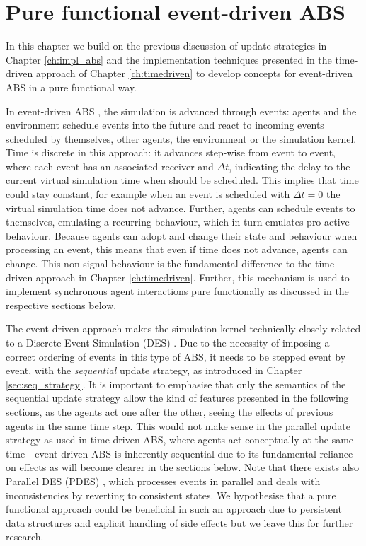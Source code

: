 \chapter{Pure functional event-driven ABS}
\label{ch:eventdriven}

In this chapter we build on the previous discussion of update strategies in Chapter \ref{ch:impl_abs} and the implementation techniques presented in the time-driven approach of Chapter \ref{ch:timedriven} to develop concepts for event-driven ABS in a pure functional way. 

\medskip

In event-driven ABS \cite{meyer_event-driven_2014}, the simulation is advanced through events: agents and the environment schedule events into the future and react to incoming events scheduled by themselves, other agents, the environment or the simulation kernel. Time is discrete in this approach: it advances step-wise from event to event, where each event has an associated receiver and $\Delta t$, indicating the delay to the current virtual simulation time when should be scheduled. This implies that time could stay constant, for example when an event is scheduled with $\Delta t = 0$ the virtual simulation time does not advance. Further, agents can schedule events to themselves, emulating a recurring behaviour, which in turn emulates pro-active behaviour. Because agents can adopt and change their state and behaviour when processing an event, this means that even if time does not advance, agents can change. This non-signal behaviour is the fundamental difference to the time-driven approach in Chapter \ref{ch:timedriven}. Further, this mechanism is used to implement synchronous agent interactions pure functionally as discussed in the respective sections below.

The event-driven approach makes the simulation kernel technically closely related to a Discrete Event Simulation (DES) \cite{zeigler_theory_2000}. Due to the necessity of imposing a correct ordering of events in this type of ABS, it needs to be stepped event by event, with the \textit{sequential} update strategy, as introduced in Chapter \ref{sec:seq_strategy}. It is important to emphasise that only the semantics of the sequential update strategy allow the kind of features  presented in the following sections, as the agents act one after the other, seeing the effects of previous agents in the same time step. This would not make sense in the parallel update strategy as used in time-driven ABS, where agents act conceptually at the same time - event-driven ABS is inherently sequential due to its fundamental reliance on effects as will become clearer in the sections below. Note that there exists also Parallel DES (PDES) \cite{fujimoto_parallel_1990}, which processes events in parallel and deals with inconsistencies by reverting to consistent states. We hypothesise that a pure functional approach could be beneficial in such an approach due to persistent data structures and explicit handling of side effects but we leave this for further research.

